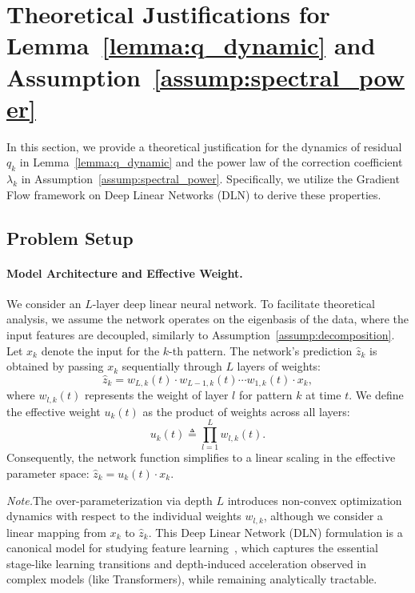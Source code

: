 \documentclass{article}
\theoremstyle{plain}
\theoremstyle{definition}
\theoremstyle{remark}
\begin{document}
\section{Theoretical Justifications for Lemma~\ref{lemma:q_dynamic} and Assumption~\ref{assump:spectral_power}}
\label{app:derivation_assumptions}
In this section, we provide a theoretical justification for the dynamics of residual $q_k$ in Lemma~\ref{lemma:q_dynamic} and the power law of the correction coefficient $\lambda_k$ in Assumption~\ref{assump:spectral_power}. Specifically, we utilize the Gradient Flow framework on Deep Linear Networks (DLN) to derive these properties.


\subsection{Problem Setup}
\paragraph{Model Architecture and Effective Weight.} 
We consider an $L$-layer deep linear neural network. To facilitate theoretical analysis, we assume the network operates on the eigenbasis of the data, where the input features are decoupled, similarly to Assumption~\ref{assump:decomposition}.
Let $x_k$ denote the input for the $k$-th pattern. The network's prediction $\hat{z}_k$ is obtained by passing $x_k$ sequentially through $L$ layers of weights:
\begin{equation*}
    \hat{z}_k = w_{L,k}(t) \cdot w_{L-1,k}(t) \cdots w_{1,k}(t) \cdot x_k,
\end{equation*}
where $w_{l,k}(t)$ represents the weight of layer $l$ for pattern $k$ at time $t$. 
We define the effective weight $u_k(t)$ as the product of weights across all layers:
\begin{equation*}
    u_k(t) \triangleq \prod_{l=1}^L w_{l,k}(t).
\end{equation*}
Consequently, the network function simplifies to a linear scaling in the effective parameter space: $\hat{z}_k = u_k(t) \cdot x_k$.

\textit{Note.}\quad The over-parameterization via depth $L$ introduces non-convex optimization dynamics with respect to the individual weights $w_{l,k}$, although we consider a linear mapping from $x_k$ to $\hat{z}_k$. This Deep Linear Network (DLN) formulation is a canonical model for studying feature learning~\citep{saxe2013exact}, which captures the essential stage-like learning transitions and depth-induced acceleration observed in complex models (like Transformers), while remaining analytically tractable.
\end{document}
